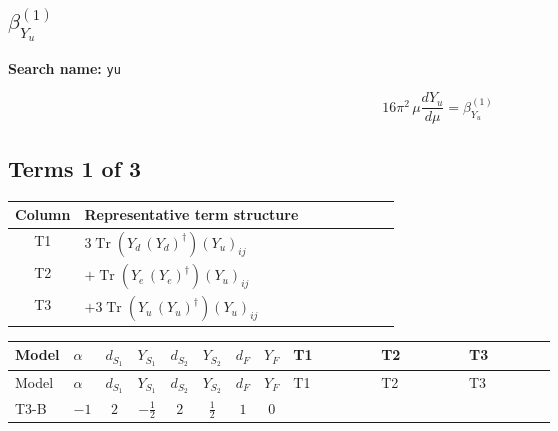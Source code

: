 \documentclass[8pt]{article}
\begin{document}
\begin{landscape}
\section*{$\beta_{Y_u}^{(1)}$}
\noindent\textbf{Search name: }\texttt{yu}\par\smallskip
\[16\pi^2\,\mu\frac{d Y_u}{d\mu}=\beta_{Y_u}^{(1)}\]
\subsection*{Terms 1 of 3}
\begin{center}
\begin{tabular}{@{}c >{\raggedright\arraybackslash}p{0.82\linewidth}@{}}
\toprule
Column & Representative term structure \\
\midrule
T1 & \(\displaystyle 3 \operatorname{Tr}\!\left({Y_d}\,\left({Y_d}\right)^{\dagger}\right) \left({Y_u}\right)_{ij}\) \\
\midrule
T2 & \(\displaystyle +\operatorname{Tr}\!\left({Y_e}\,\left({Y_e}\right)^{\dagger}\right) \left({Y_u}\right)_{ij}\) \\
\midrule
T3 & \(\displaystyle +3 \operatorname{Tr}\!\left({Y_u}\,\left({Y_u}\right)^{\dagger}\right) \left({Y_u}\right)_{ij}\) \\
\midrule
\bottomrule
\end{tabular}
\end{center}
\smallskip
\tiny
\begin{longtable}{@{}llcccccc >{\raggedright\arraybackslash}p{0.21\linewidth} >{\raggedright\arraybackslash}p{0.21\linewidth} >{\raggedright\arraybackslash}p{0.21\linewidth}@{}}
\toprule
Model & $\alpha$ & $d_{S_1}$ & $Y_{S_1}$ & $d_{S_2}$ & $Y_{S_2}$ & $d_F$ & $Y_F$ & T1 & T2 & T3 \\
\midrule
\endfirsthead
\toprule
Model & $\alpha$ & $d_{S_1}$ & $Y_{S_1}$ & $d_{S_2}$ & $Y_{S_2}$ & $d_F$ & $Y_F$ & T1 & T2 & T3 \\
\midrule
\endhead
T3-B & $-1$ & $2$ & $-\frac{1}{2}$ & $2$ & $\frac{1}{2}$ & $1$ & $0$ & \scriptsize\adjustbox{max width=\linewidth}{$\begin{gathered} 3 \operatorname{Tr}\!\left({Y_d}\,\left({Y_d}\right)^{\dagger}\right) \left({Y_u}\right)_{ij}\end{gathered}$} & \scriptsize\adjustbox{max width=\linewidth}{$\begin{gathered} +\operatorname{Tr}\!\left({Y_e}\,\left({Y_e}\right)^{\dagger}\right) \left({Y_u}\right)_{ij}\end{gathered}$} & \scriptsize\adjustbox{max width=\linewidth}{$\begin{gathered} +3 \operatorname{Tr}\!\left({Y_u}\,\left({Y_u}\right)^{\dagger}\right) \left({Y_u}\right)_{ij}\end{gathered}$} \\

\end{longtable}
\end{landscape}
\end{document}

